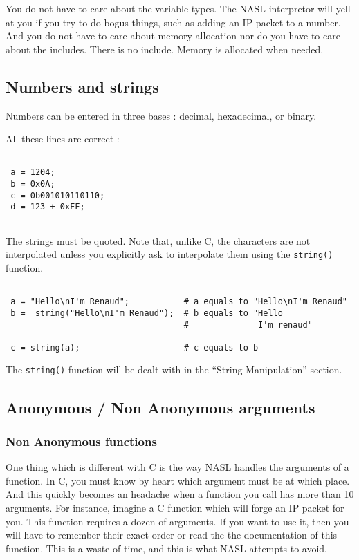 \documentclass{article}
\begin{document}
 
You do not have to care about the variable types. The
NASL interpretor will yell at you if you try to do bogus
things, such as adding an IP packet to a number.
And you do not have to care about memory allocation nor
do you have to care about the includes. There is no
include. Memory is allocated when needed.

\subsection{Numbers and strings}

Numbers can be entered in three bases : decimal, hexadecimal, or binary.

All these lines are correct :
\begin{verbatim}

 a = 1204;
 b = 0x0A;
 c = 0b001010110110;
 d = 123 + 0xFF;
 
\end{verbatim}

The strings must be quoted. Note that, unlike C, the characters are not interpolated
unless you explicitly ask to interpolate them using the \verb+string()+ function.

\begin{verbatim}

 a = "Hello\nI'm Renaud";           # a equals to "Hello\nI'm Renaud"
 b =  string("Hello\nI'm Renaud");  # b equals to "Hello
                                    #              I'm renaud"  	

 c = string(a);                     # c equals to b

\end{verbatim}

The \verb+string()+ function will be dealt with in the ``String Manipulation'' section.

\subsection{Anonymous / Non Anonymous arguments}


\subsubsection{Non Anonymous functions}

One thing which is different with C is the way NASL handles the 
arguments of a function. In C, you must know by heart which argument
must be at which place. And this quickly becomes an headache 
when a function you call has more than 10 arguments.
For instance, imagine a C function which will forge an IP packet for
you. This function requires a dozen of arguments. If you want to use
it, then you will have to remember their exact order or read the
the documentation of this function. This is a waste of time, and
this is what NASL attempts to avoid.\\
\end{document}
